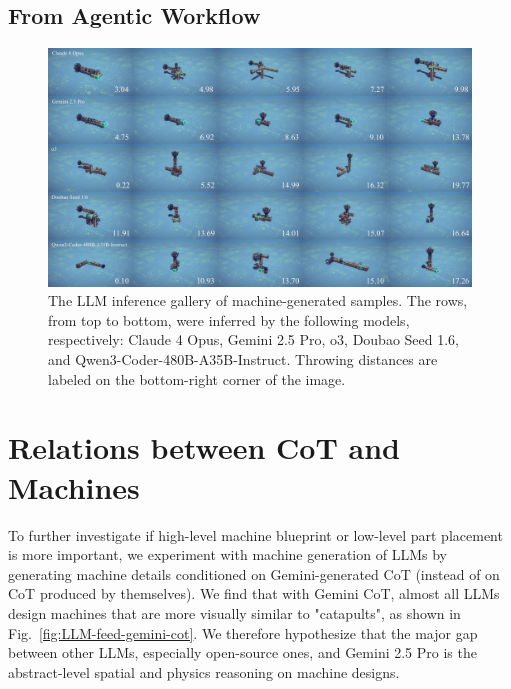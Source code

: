 \subsection{From Agentic Workflow}
\begin{figure}[h!]
  \centering
  \includegraphics[width=\linewidth]{figures/test_time_scaling_gallery_withcaption.pdf}
  \caption{\footnotesize The LLM inference gallery of machine-generated samples. The rows, from top to bottom, were inferred by the following models, respectively: Claude 4 Opus, Gemini 2.5 Pro, o3, Doubao Seed 1.6, and Qwen3-Coder-480B-A35B-Instruct. Throwing distances are labeled on the bottom-right corner of the image.}
  \label{fig:test_time_scaling_gallery}
\end{figure}


\clearpage
\newpage
\section{Relations between CoT and Machines}



To further investigate if high-level machine blueprint or low-level part placement is more important, 
we experiment with machine generation of LLMs by generating machine details conditioned on Gemini-generated CoT (instead of on CoT produced by themselves). 
We find that with Gemini CoT, almost all LLMs design machines that are more visually similar to "catapults", as shown in Fig.~\ref{fig:LLM-feed-gemini-cot}. We therefore hypothesize that the major gap between other LLMs, especially open-source ones, and Gemini 2.5 Pro is the abstract-level spatial and physics reasoning on machine designs.


